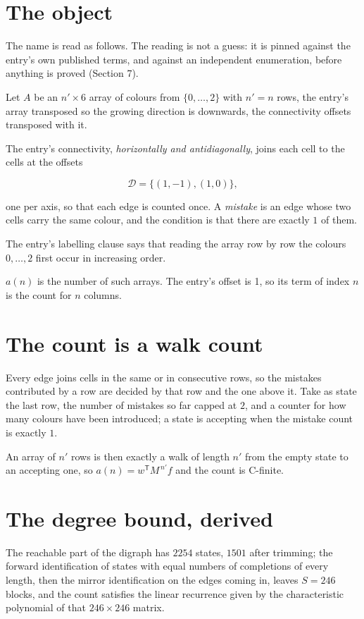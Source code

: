 \documentclass[11pt]{article}
\theoremstyle{definition}
\begin{document}
\section{The object}

The name is read as follows. The reading is not a guess: it is pinned against the entry's own published terms, and against an independent enumeration, before anything is proved (Section 7).

Let $A$ be an $n' \times 6$ array of colours from $\{0,\dots,2\}$ with $n' = n$ rows, the entry's array transposed so the growing direction is downwards, the connectivity offsets transposed with it.

The entry's connectivity, {\itshape horizontally and antidiagonally}, joins each cell to the cells at the offsets

\[\mathcal{D} = \{(1,-1), (1,0)\},\]

one per axis, so that each edge is counted once. A {\itshape mistake} is an edge whose two cells carry the same colour, and the condition is that there are exactly $1$ of them.

The entry's labelling clause says that reading the array row by row the colours $0,\dots,2$ first occur in increasing order.

$a(n)$ is the number of such arrays. The entry's offset is 1, so its term of index $n$ is the count for $n$ columns.

\section{The count is a walk count}

Every edge joins cells in the same or in consecutive rows, so the mistakes contributed by a row are decided by that row and the one above it. Take as state the last row, the number of mistakes so far capped at $2$, and a counter for how many colours have been introduced; a state is accepting when the mistake count is exactly $1$.

An array of $n'$ rows is then exactly a walk of length $n'$ from the empty state to an accepting one, so $a(n) = w^{\mathsf T}M^{\,n'}f$ and the count is C-finite.

\section{The degree bound, derived}

The reachable part of the digraph has $2254$ states, $1501$ after trimming; the forward identification of states with equal numbers of completions of every length, then the mirror identification on the edges coming in, leaves $S = 246$ blocks, and the count satisfies the linear recurrence given by the characteristic polynomial of that $246\times246$ matrix.
\end{document}
